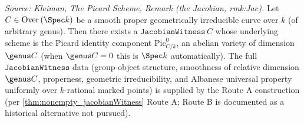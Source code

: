 \begin{theorem}\leanok
[The Picard Albanese witness \(J = \Pic^0_{C/k}\)]
  \label{def:picardJacobianWitness}

  \textit{Source: Kleiman, The Picard Scheme, Remark (the Jacobian, rmk:Jac).}
  Let \(C \in \mathrm{Over}\,(\Spec k)\) be a smooth proper geometrically irreducible curve over \(k\) (of arbitrary genus). Then there exists a \(\mathtt{JacobianWitness}\,C\) whose underlying scheme is the Picard identity component \(\mathrm{Pic}^0_{C/k}\), an abelian variety of dimension \(\genus C\) (when \(\genus C = 0\) this is \(\Spec k\) automatically). The full \(\mathtt{JacobianWitness}\) data (group-object structure, smoothness of relative dimension \(\genus C\), properness, geometric irreducibility, and Albanese universal property uniformly over \(k\)-rational marked points) is supplied by the Route A construction (per \cref{thm:nonempty_jacobianWitness} Route A; Route B is documented as a historical alternative not pursued).
\end{theorem}
